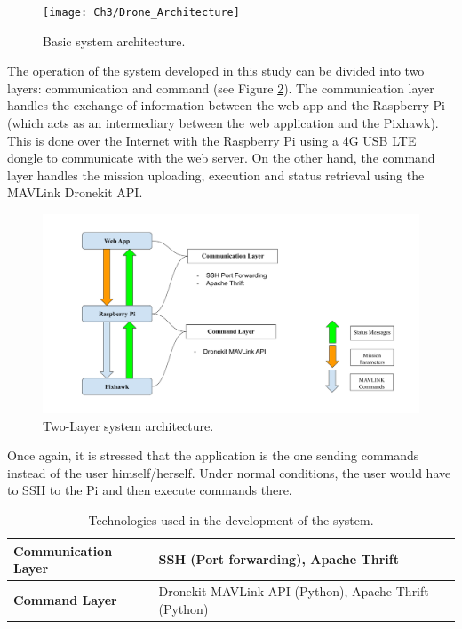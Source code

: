 \begin{figure}[t]
	\texttt{[image: Ch3/Drone\_Architecture]}
	\caption{Basic system architecture.}
	\label{fig:system}
\end{figure}
\FloatBarrier

The operation of the system developed in this study can be divided into two layers: communication and command (see Figure \ref{fig:layersystem}). The communication layer handles the exchange of information between the web app and the Raspberry Pi (which acts as an intermediary between the web application and the Pixhawk). This is done over the Internet with the Raspberry Pi using a 4G USB LTE dongle to communicate with the web server. On the other hand, the command layer handles the mission uploading, execution and status retrieval using the MAVLink Dronekit API. 

\begin{figure}[t]
	\includegraphics[width=\textwidth]{figures/Ch3/Layer_Drone_Architecture.png}
	\caption{Two-Layer system architecture.}
	\label{fig:layersystem}
\end{figure}
\FloatBarrier

Once again, it is stressed that the application is the one sending commands instead of the user himself/herself. Under normal conditions, the user would have to SSH to the Pi and then execute commands there.

\begin{table}[t]
 \caption{Technologies used in the development of the system.}
 \linespread{0.8}\selectfont
 \begin{center}
     \begin{tabular}{|m{5cm}|m{8cm}|} 
     \hline
     \textbf{Communication Layer} & SSH (Port forwarding), Apache Thrift \\ 
     \hline
     \textbf{Command Layer} & Dronekit MAVLink API (Python), Apache Thrift (Python) \\ 
     [1ex] 
     \hline
 \end{tabular}
 \end{center}{}
\end{table}
\FloatBarrier

